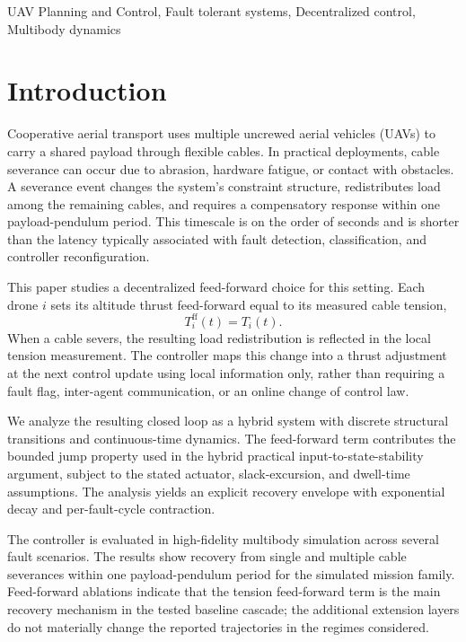 \documentclass[lettersize,journal]{IEEEtran}
\begin{document}
\begin{IEEEkeywords}
UAV Planning and Control, Fault tolerant systems, Decentralized control, Multibody dynamics
\end{IEEEkeywords}


\section{Introduction}
\label{sec:Introduction}
Cooperative aerial transport uses multiple uncrewed aerial vehicles (UAVs) to carry a shared payload through flexible cables. In practical deployments, cable severance can occur due to abrasion, hardware fatigue, or contact with obstacles. A severance event changes the system's constraint structure, redistributes load among the remaining cables, and requires a compensatory response within one payload-pendulum period. This timescale is on the order of seconds and is shorter than the latency typically associated with fault detection, classification, and controller reconfiguration.

This paper studies a decentralized feed-forward choice for this setting. Each drone $i$ sets its altitude thrust feed-forward equal to its measured cable tension,
\begin{equation}
  T_i^{\mathrm{ff}}(t) = T_i(t).
\end{equation}
When a cable severs, the resulting load redistribution is reflected in the local tension measurement. The controller maps this change into a thrust adjustment at the next control update using local information only, rather than requiring a fault flag, inter-agent communication, or an online change of control law.

We analyze the resulting closed loop as a hybrid system with discrete structural transitions and continuous-time dynamics. The feed-forward term contributes the bounded jump property used in the hybrid practical input-to-state-stability argument, subject to the stated actuator, slack-excursion, and dwell-time assumptions. The analysis yields an explicit recovery envelope with exponential decay and per-fault-cycle contraction.

The controller is evaluated in high-fidelity multibody simulation across several fault scenarios. The results show recovery from single and multiple cable severances within one payload-pendulum period for the simulated mission family. Feed-forward ablations indicate that the tension feed-forward term is the main recovery mechanism in the tested baseline cascade; the additional extension layers do not materially change the reported trajectories in the regimes considered.
\end{document}
